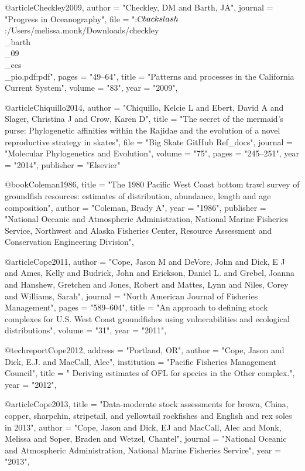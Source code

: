 @article{Checkley2009,
    author = "{Checkley, DM and Barth, JA}",
    journal = "{Progress in Oceanography}",
    file = "{:C$\\backslash$:/Users/melissa.monk/Downloads/checkley\\_barth\\_09\\_ccs\\_pio.pdf:pdf}",
    pages = "{49--64}",
    title = "{{Patterns and processes in the California Current System}}",
    volume = "{83}",
    year = "{2009}",
}

@article{Chiquillo2014,
  author = "{Chiquillo, Kelcie L and Ebert, David A and Slager, Christina J and Crow, Karen D}",
  title = "{The secret of the mermaid’s purse: Phylogenetic affinities within the Rajidae and the evolution of a novel reproductive strategy in skates}",
  file = "{Big Skate GitHub Ref_docs}",
  journal = "{Molecular Phylogenetics and Evolution}",
  volume = "{75}",
  pages = "{245--251}",
  year = "{2014}",
  publisher = "{Elsevier}"
}

@book{Coleman1986,
    title = "{The 1980 Pacific West Coast bottom trawl survey of groundfish resources: estimates of distribution, abundance, length and age composition}",
    author = "{Coleman, Brady A}",
    year = "{1986}",
    publisher = "{National Oceanic and Atmospheric Administration, National Marine Fisheries Service, Northwest and Alaska Fisheries Center, Resource Assessment and Conservation Engineering Division}",
}

@article{Cope2011,
    author = "{Cope, Jason M and DeVore, John and Dick, E J and Ames, Kelly and Budrick, John and Erickson, Daniel L. and Grebel, Joanna and Hanshew, Gretchen and Jones, Robert and Mattes, Lynn and Niles, Corey and Williams, Sarah}",
    journal = "{North American Journal of Fisheries Management}",
    pages = "{589--604}",
    title = "{{An approach to defining stock complexes for U.S. West Coast groundfishes using vulnerabilities and ecological distributions}}",
    volume = "{31}",
    year = "{2011}",
}

@techreport{Cope2012,
    address = "{Portland, OR}",
    author = "{Cope, Jason and Dick, E.J. and MacCall, Alec}",
    institution = "{Pacific Fisheries Management Council}",
    title = "{{ Deriving estimates of OFL for species in the Other\nFish complex.}}",
    year = "{2012}",
}

@article{Cope2013,
    title = "{Data-moderate stock assessments for brown, China, copper, sharpchin, stripetail, and yellowtail rockfishes and English and rex soles in 2013}",
    author = "{Cope, Jason and Dick, EJ and MacCall, Alec and Monk, Melissa and Soper, Braden and Wetzel, Chantel}",
    journal = "{National Oceanic and Atmospheric Administration, National Marine Fisheries Service}",
    year = "{2013}",
}

